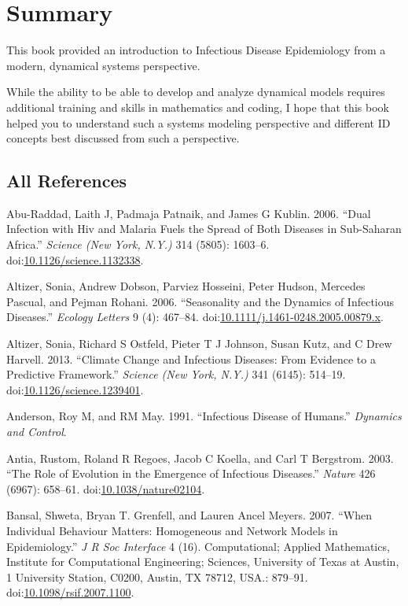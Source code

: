 \documentclass[]{article}
\theoremstyle{definition}
\theoremstyle{definition}
\theoremstyle{definition}
\theoremstyle{remark}
\begin{document}
\section{Summary}\label{summary}

This book provided an introduction to Infectious Disease Epidemiology
from a modern, dynamical systems perspective.

While the ability to be able to develop and analyze dynamical models
requires additional training and skills in mathematics and coding, I
hope that this book helped you to understand such a systems modeling
perspective and different ID concepts best discussed from such a
perspective.

\subsection{All References}\label{all-references}

\hypertarget{refs}{}
\hypertarget{ref-abu-raddad06}{}
Abu-Raddad, Laith J, Padmaja Patnaik, and James G Kublin. 2006. ``Dual
Infection with Hiv and Malaria Fuels the Spread of Both Diseases in
Sub-Saharan Africa.'' \emph{Science (New York, N.Y.)} 314 (5805):
1603--6.
doi:\href{https://doi.org/10.1126/science.1132338}{10.1126/science.1132338}.

\hypertarget{ref-altizer06}{}
Altizer, Sonia, Andrew Dobson, Parviez Hosseini, Peter Hudson, Mercedes
Pascual, and Pejman Rohani. 2006. ``Seasonality and the Dynamics of
Infectious Diseases.'' \emph{Ecology Letters} 9 (4): 467--84.
doi:\href{https://doi.org/10.1111/j.1461-0248.2005.00879.x}{10.1111/j.1461-0248.2005.00879.x}.

\hypertarget{ref-altizer13}{}
Altizer, Sonia, Richard S Ostfeld, Pieter T J Johnson, Susan Kutz, and C
Drew Harvell. 2013. ``Climate Change and Infectious Diseases: From
Evidence to a Predictive Framework.'' \emph{Science (New York, N.Y.)}
341 (6145): 514--19.
doi:\href{https://doi.org/10.1126/science.1239401}{10.1126/science.1239401}.

\hypertarget{ref-anderson91}{}
Anderson, Roy M, and RM May. 1991. ``Infectious Disease of Humans.''
\emph{Dynamics and Control}.

\hypertarget{ref-antia03}{}
Antia, Rustom, Roland R Regoes, Jacob C Koella, and Carl T Bergstrom.
2003. ``The Role of Evolution in the Emergence of Infectious Diseases.''
\emph{Nature} 426 (6967): 658--61.
doi:\href{https://doi.org/10.1038/nature02104}{10.1038/nature02104}.

\hypertarget{ref-bansal07}{}
Bansal, Shweta, Bryan T. Grenfell, and Lauren Ancel Meyers. 2007. ``When
Individual Behaviour Matters: Homogeneous and Network Models in
Epidemiology.'' \emph{J R Soc Interface} 4 (16). Computational; Applied
Mathematics, Institute for Computational Engineering; Sciences,
University of Texas at Austin, 1 University Station, C0200, Austin, TX
78712, USA.: 879--91.
doi:\href{https://doi.org/10.1098/rsif.2007.1100}{10.1098/rsif.2007.1100}.
\end{document}

